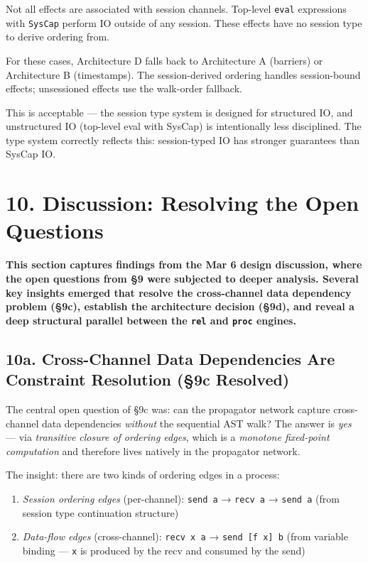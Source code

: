 \documentclass[11pt]{article}
\begin{document}
Not all effects are associated with session channels. Top-level \texttt{eval}
expressions with \texttt{SysCap} perform IO outside of any session. These effects
have no session type to derive ordering from.

For these cases, Architecture D falls back to Architecture A (barriers) or
Architecture B (timestamps). The session-derived ordering handles session-bound
effects; unsessioned effects use the walk-order fallback.

This is acceptable — the session type system is designed for structured IO,
and unstructured IO (top-level eval with SysCap) is intentionally less
disciplined. The type system correctly reflects this: session-typed IO has
stronger guarantees than SysCap IO.
\section{10. Discussion: Resolving the Open Questions}
\label{sec:org2db6e7f}

\textbf{This section captures findings from the Mar 6 design discussion, where the
open questions from §9 were subjected to deeper analysis. Several key insights
emerged that resolve the cross-channel data dependency problem (§9c), establish
the architecture decision (§9d), and reveal a deep structural parallel between
the \texttt{rel} and \texttt{proc} engines.}
\subsection{10a. Cross-Channel Data Dependencies Are Constraint Resolution (§9c Resolved)}
\label{sec:org85d388c}

The central open question of §9c was: can the propagator network capture
cross-channel data dependencies \emph{without} the sequential AST walk? The answer
is \emph{yes} — via \emph{transitive closure of ordering edges}, which is a
\emph{monotone fixed-point computation} and therefore lives natively in the
propagator network.

The insight: there are two kinds of ordering edges in a process:

\begin{enumerate}
\item \emph{Session ordering edges} (per-channel): \texttt{send a} → \texttt{recv a} → \texttt{send a}
(from session type continuation structure)
\item \emph{Data-flow edges} (cross-channel): \texttt{recv x a} → \texttt{send [f x] b}
(from variable binding — \texttt{x} is produced by the recv and consumed by the send)
\end{enumerate}
\end{document}
